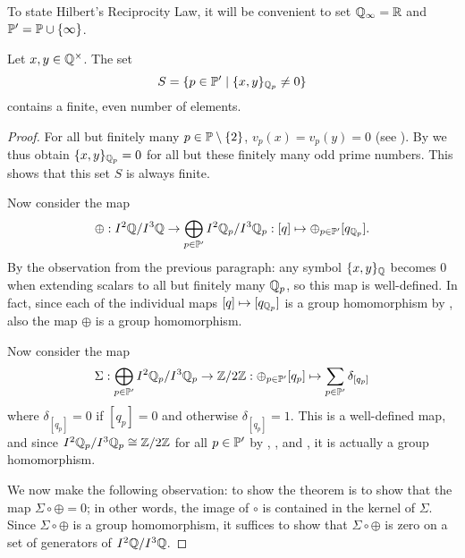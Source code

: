 \documentclass[12pt, leqno, british]{amsart}
\begin{document}
To state Hilbert's Reciprocity Law, it will be convenient to set $\mathbb Q_{\infty} = \mathbb R$ and $\mathbb P' = \mathbb P \cup \lbrace \infty \rbrace$.
\begin{thm}\label{T:HilbertReciprocity}
Let $x, y \in \mathbb Q^\times$.
The set
$$ S = \lbrace p \in \mathbb P' \mid \lbrace x, y \rbrace_{\mathbb Q_p} \neq 0 \rbrace$$
contains a finite, even number of elements.
\end{thm}
\begin{proof}
For all but finitely many $p \in \mathbb P \setminus \lbrace 2 \rbrace$, $v_p(x) = v_p(y) = 0$ (see ).
By  we thus obtain $\lbrace x, y \rbrace_{\mathbb Q_p} = 0$ for all but these finitely many odd prime numbers.
This shows that this set $S$ is always finite.

Now consider the map
\begin{displaymath}
\oplus : I^2\mathbb Q /I^3\mathbb Q \to \bigoplus_{p \in \mathbb P'} I^2\mathbb Q_p/I^3\mathbb Q_p : [q] \mapsto \oplus_{p \in \mathbb P'} [q_{\mathbb Q_p}].
\end{displaymath}
By the observation from the previous paragraph: any symbol $\lbrace x, y \rbrace_{\mathbb Q}$ becomes $0$ when extending scalars to all but finitely many $\mathbb Q_p$, so this map is well-defined.
In fact, since each of the individual maps $[q] \mapsto [q_{\mathbb Q_p}]$ is a group homomorphism by , also the map $\oplus$ is a group homomorphism.

Now consider the map
\begin{displaymath}
\Sigma : \bigoplus_{p \in \mathbb P'} I^2\mathbb Q_p/I^3\mathbb Q_p \to \mathbb Z/2\mathbb Z : \oplus_{p \in \mathbb P'} [q_p] \mapsto \sum_{p \in \mathbb P'} \delta_{[q_p]}
\end{displaymath}
where $\delta_{[q_p]} = 0$ if $[q_p] = 0$ and otherwise $\delta_{[q_p]} = 1$.
This is a well-defined map, and since $I^2\mathbb Q_p/I^3\mathbb Q_p \cong \mathbb Z/2\mathbb Z$ for all $p \in \mathbb P'$ by , , and , it is actually a group homomorphism.

We now make the following observation: to show the theorem is to show that the map $\Sigma \circ \oplus = 0$; in other words, the image of $\circ$ is contained in the kernel of $\Sigma$.
Since $\Sigma \circ \oplus$ is a group homomorphism, it suffices to show that $\Sigma \circ \oplus$ is zero on a set of generators of $I^2\mathbb Q/I^3\mathbb Q$.


\end{proof}
\end{document}
